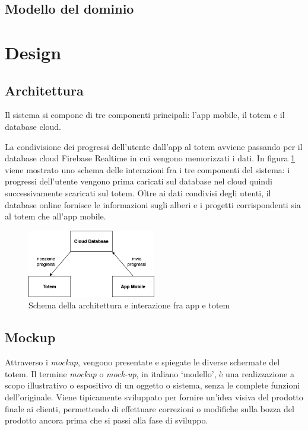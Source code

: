 \subsection{Modello del dominio}
%
%
%
%
\section{Design}
\subsection{Architettura}
Il sistema si compone di tre componenti principali: l'app mobile, il totem e il database cloud.

La condivisione dei progressi dell'utente dall'app al totem avviene passando per il database cloud Firebase Realtime in cui vengono memorizzati i dati.
In figura \ref{fig:communication-schema} viene mostrato uno schema delle interazioni fra i tre componenti del sistema: i progressi dell'utente vengono prima caricati sul database nel cloud quindi successivamente scaricati sul totem.
Oltre ai dati condivisi degli utenti, il database online fornisce le informazioni sugli alberi e i progetti corrispondenti sia al totem che all'app mobile.
\begin{figure} [h]
    \centering
    \includegraphics[width=0.5\textwidth]{img/arch-totem-app-dati.png}
    \caption{Schema della architettura e interazione fra app e totem}
    \label{fig:communication-schema}
\end{figure}

\subsection{Mockup}
Attraverso i \textit{mockup}, vengono presentate e spiegate le diverse schermate del totem.
Il termine \textit{mockup} o \textit{mock-up}, in italiano \enquote*{modello}, è una realizzazione a scopo illustrativo o espositivo di un oggetto o sistema, senza le complete funzioni dell'originale. Viene tipicamente sviluppato per fornire un'idea visiva del prodotto finale ai clienti, permettendo di effettuare correzioni o modifiche sulla bozza del prodotto ancora prima che si passi alla fase di sviluppo.

